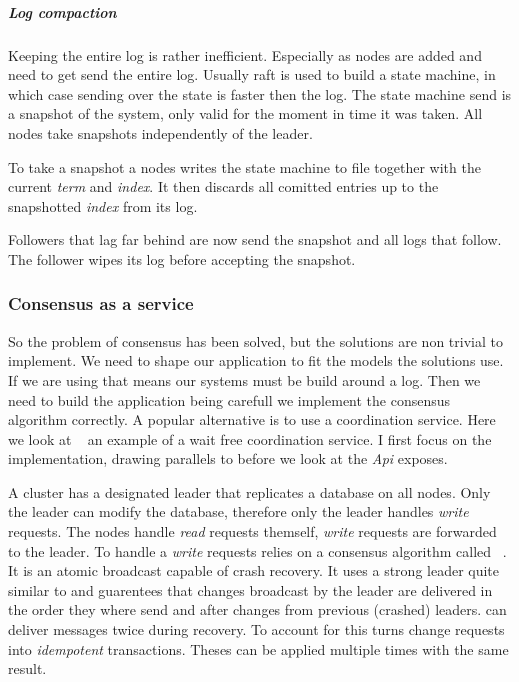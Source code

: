 \subparagraph{Log compaction} \label{par:logcomp}
Keeping the entire log is rather inefficient. Especially as nodes are added and need to get send the entire log. Usually raft is used to build a state machine, in which case sending over the state is faster then the log. The state machine send is a snapshot of the system, only valid for the moment in time it was taken. All nodes take snapshots independently of the leader. 

To take a snapshot a nodes writes the state machine to file together with the current \textit{term} and \textit{index}. It then discards all comitted entries up to the snapshotted \textit{index} from its log. 

Followers that lag far behind are now send the snapshot and all logs that follow. The follower wipes its log before accepting the snapshot.

\subsubsection*{Consensus as a service}
So the problem of consensus has been solved, but the solutions are non trivial to implement. We need to shape our application to fit the models the solutions use. If we are using \raft{} that means our systems must be build around a log. Then we need to build the application being carefull we implement the consensus algorithm correctly. A popular alternative is to use a coordination service. Here we look at \zookeeper{}~\cite{zookeeper} an example of a wait free coordination service. I first focus on the implementation, drawing parallels to \raft{} before we look at the \textit{Api} \zookeeper{} exposes.

A \zookeeper{} cluster has a designated leader that replicates a database on all nodes. Only the leader can modify the database, therefore only the leader handles \textit{write} requests. The nodes handle \textit{read} requests themself, \textit{write} requests are forwarded to the leader. To handle a \textit{write} requests \zookeeper{} relies on a consensus algorithm called \zab{}~\cite{zab}. It is an atomic broadcast capable of crash recovery. It uses a strong leader quite similar to \raft{} and guarentees that changes broadcast by the leader are delivered in the order they where send and after changes from previous (crashed) leaders. \zab{} can deliver messages twice during recovery. To account for this \zookeeper{} turns change requests into \textit{idempotent} transactions. Theses can be applied multiple times with the same result.

